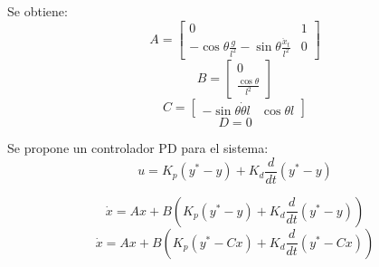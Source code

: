 \documentclass{article}
\begin{document}
                Se obtiene:
                \begin{equation}
                    A = \begin{bmatrix}
                        0 & 1 \\
                        -\cos{\theta}\frac{g}{l^2}-\sin{\theta}\frac{\ddot{x}_t}{l^2} & 0
                    \end{bmatrix}
                \end{equation}
                \begin{equation}
                    B = \begin{bmatrix}
                        0 \\
                        \frac{\cos{\theta}}{l^2}
                    \end{bmatrix}
                \end{equation}
                \begin{equation}
                    C = \begin{bmatrix}
                        -\sin{\theta}\dot{\theta}l & \cos{\theta}l
                    \end{bmatrix}
                \end{equation}
                \begin{equation}
                    D = 0
                \end{equation}

                Se propone un controlador PD para el sistema:
                \begin{equation}
                    u =  K_p (y^*-y) + K_d \frac{d}{dt}(y^*-y)
                \end{equation}

                \begin{equation}
                    \dot{x} = A x + B ( K_p (y^*-y) + K_d \frac{d}{dt}(y^*-y))
                \end{equation}
                \begin{equation}
                    \dot{x} = A x + B ( K_p (y^*-C x) + K_d \frac{d}{dt}(y^*-C x))
                \end{equation}
\end{document}
